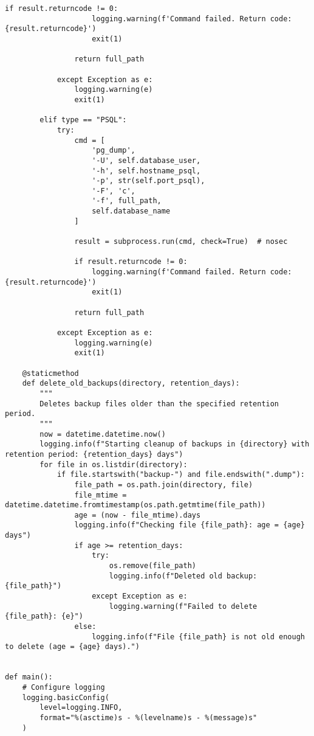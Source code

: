 \begin{lstlisting}[language=script, caption={Python-script voor back-ups en retentiebeleid.}]
                if result.returncode != 0:
                    logging.warning(f'Command failed. Return code: {result.returncode}')
                    exit(1)

                return full_path

            except Exception as e:
                logging.warning(e)
                exit(1)

        elif type == "PSQL":
            try:
                cmd = [
                    'pg_dump',
                    '-U', self.database_user,
                    '-h', self.hostname_psql,
                    '-p', str(self.port_psql),
                    '-F', 'c',
                    '-f', full_path,
                    self.database_name
                ]

                result = subprocess.run(cmd, check=True)  # nosec

                if result.returncode != 0:
                    logging.warning(f'Command failed. Return code: {result.returncode}')
                    exit(1)

                return full_path

            except Exception as e:
                logging.warning(e)
                exit(1)

    @staticmethod
    def delete_old_backups(directory, retention_days):
        """
        Deletes backup files older than the specified retention period.
        """
        now = datetime.datetime.now()
        logging.info(f"Starting cleanup of backups in {directory} with retention period: {retention_days} days")
        for file in os.listdir(directory):
            if file.startswith("backup-") and file.endswith(".dump"):
                file_path = os.path.join(directory, file)
                file_mtime = datetime.datetime.fromtimestamp(os.path.getmtime(file_path))
                age = (now - file_mtime).days
                logging.info(f"Checking file {file_path}: age = {age} days")
                if age >= retention_days:
                    try:
                        os.remove(file_path)
                        logging.info(f"Deleted old backup: {file_path}")
                    except Exception as e:
                        logging.warning(f"Failed to delete {file_path}: {e}")
                else:
                    logging.info(f"File {file_path} is not old enough to delete (age = {age} days).")


def main():
    # Configure logging
    logging.basicConfig(
        level=logging.INFO,
        format="%(asctime)s - %(levelname)s - %(message)s"
    )


\end{lstlisting}
